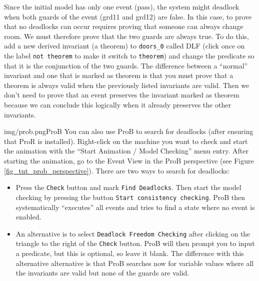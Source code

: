 Since the initial model has only one event (\textsf{pass}), the system might deadlock when both guards of the event (\textsf{grd11} and \textsf{grd12}) are false.
In this case, to prove that no deadlocks can occur requires proving that someone can always change room. We must therefore prove that the two guards are always true. 
To do this, add a new derived invariant (a theorem) to \texttt{doors\_0} called \textsf{DLF} (click once on the label \texttt{not theorem} to make it switch to \texttt{theorem})
  and change the predicate so that it is the conjunction of the two guards.
The difference between a ``normal'' invariant and one that is marked as theorem is that you must prove that a theorem is always valid when the previously listed invariants are valid. Then we don't need to prove that an event preserves the invariant marked as theorem because we can conclude this logically when it already preserves the other invariants.



\begin{rodin-plugin}{img/prob.png}{ProB}%
  You can also use ProB to search for deadlocks (after ensuring that ProR is installed).
  Right-click on the machine you want to check and start the animation with the
  ``Start Animation / Model Checking'' menu entry.
  After starting the animation, go to the Event View in the ProB perspective
  (see Figure \ref{fig_tut_prob_perspective}).
  There are two ways to search for deadlocks:
  \begin{itemize}
  \item Press the \texttt{Check} button and mark \texttt{Find Deadlocks}. Then start the model checking by pressing the button \texttt{Start consistency checking}.
    ProB then systematically ``executes'' all events and tries to find a state where no
    event is enabled.
  \item An alternative is to select \texttt{Deadlock Freedom Checking} after clicking
    on the triangle to the right of the \texttt{Check} button.
    ProB will then prompt you to input a predicate, but this is optional, so leave it blank. The difference with this alternative alternative is that ProB searches now for variable values
    where all the invariants are valid but none of the guards are valid.
  \end{itemize}
\end{rodin-plugin}

